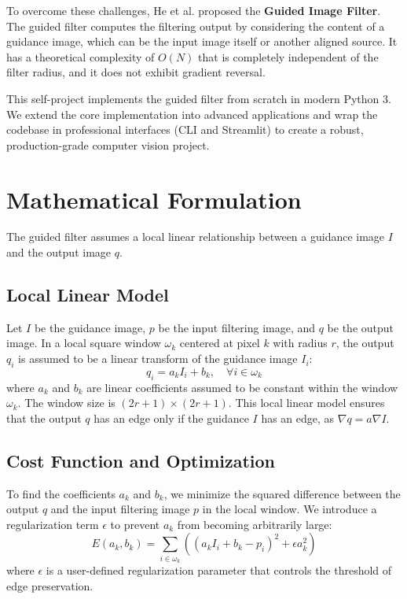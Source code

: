 \documentclass[11pt,a4paper]{article}
\begin{document}
To overcome these challenges, He et al. proposed the \textbf{Guided Image Filter}. The guided filter computes the filtering output by considering the content of a guidance image, which can be the input image itself or another aligned source. It has a theoretical complexity of $O(N)$ that is completely independent of the filter radius, and it does not exhibit gradient reversal.

This self-project implements the guided filter from scratch in modern Python 3. We extend the core implementation into advanced applications and wrap the codebase in professional interfaces (CLI and Streamlit) to create a robust, production-grade computer vision project.

\section{Mathematical Formulation}
The guided filter assumes a local linear relationship between a guidance image $I$ and the output image $q$. 

\subsection{Local Linear Model}
Let $I$ be the guidance image, $p$ be the input filtering image, and $q$ be the output image. In a local square window $\omega_k$ centered at pixel $k$ with radius $r$, the output $q_i$ is assumed to be a linear transform of the guidance image $I_i$:
\begin{equation}
    q_i = a_k I_i + b_k, \quad \forall i \in \omega_k
\end{equation}
where $a_k$ and $b_k$ are linear coefficients assumed to be constant within the window $\omega_k$. The window size is $(2r+1) \times (2r+1)$. This local linear model ensures that the output $q$ has an edge only if the guidance $I$ has an edge, as $\nabla q = a \nabla I$.

\subsection{Cost Function and Optimization}
To find the coefficients $a_k$ and $b_k$, we minimize the squared difference between the output $q$ and the input filtering image $p$ in the local window. We introduce a regularization term $\epsilon$ to prevent $a_k$ from becoming arbitrarily large:
\begin{equation}
    E(a_k, b_k) = \sum_{i \in \omega_k} \left( (a_k I_i + b_k - p_i)^2 + \epsilon a_k^2 \right)
\end{equation}
where $\epsilon$ is a user-defined regularization parameter that controls the threshold of edge preservation. 
\end{document}

